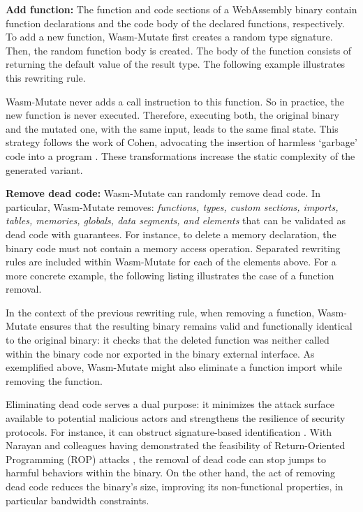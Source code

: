 \documentclass[a4paper,fleqn]{cas-dc}
\newcommand{\tool}{{\sc Wasm-Mutate}\xspace}
\begin{document}
\textbf{Add function:} The function and code sections of a WebAssembly binary contain function declarations and the code body of the declared functions, respectively.
To add a new function, \tool first creates a random type signature.
Then, the random function body is created.
The body of the function consists of returning the default value of the result type.
The following example illustrates this rewriting rule.



\tool never adds a call instruction to this function.
So in practice, the new function is never executed.
Therefore, executing both, the original binary and the mutated one, with the same input, leads to the same final state.
This strategy follows the work of Cohen, advocating the insertion of harmless `garbage' code into a program \cite{cohen1993operating}. 
These transformations increase the static complexity of the generated variant.

\textbf{Remove dead code:} \tool can randomly remove dead code.
In particular, \tool removes: \emph{functions, types, custom sections, imports, tables, memories, globals, data segments, and elements} that can be validated as dead code with guarantees.
For instance, to delete a memory declaration, the binary code must not contain a memory access operation. 
Separated rewriting rules are included within \tool for each of the elements above.
For a more concrete example, the following listing illustrates the case of a function removal.



In the context of the previous rewriting rule, when removing a function, \tool ensures that the resulting binary remains valid and functionally identical to the original binary: it checks that the deleted function was neither called within the binary code nor exported in the binary external interface. 
As exemplified above, \tool might also eliminate a function import while removing the function. 

Eliminating dead code serves a dual purpose: it minimizes the attack surface available to potential malicious actors \cite{236200} and strengthens the resilience of security protocols. 
For instance, it can obstruct signature-based identification \cite{CABRERAARTEAGA2023103296}.
With Narayan and colleagues having demonstrated the feasibility of Return-Oriented Programming (ROP) attacks \cite{Swivel}, the removal of dead code can stop jumps to harmful behaviors within the binary. 
On the other hand, the act of removing dead code reduces the binary's size, improving its non-functional properties, in particular bandwidth constraints. 
\end{document}
